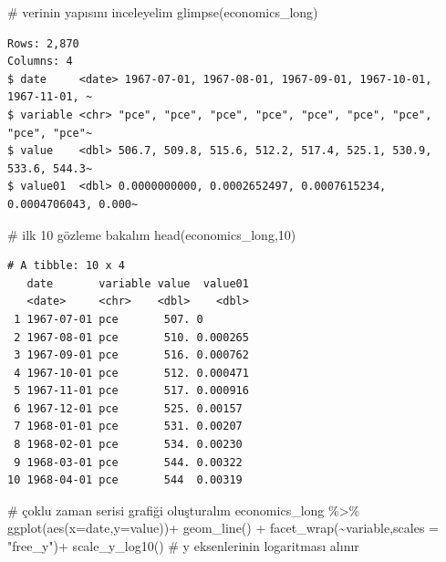 \documentclass[
  letterpaper,
  DIV=11,
  numbers=noendperiod]{scrreprt}
\newenvironment{Shaded}{\begin{snugshade}}{\end{snugshade}}
\newcommand{\AttributeTok}[1]{\textcolor[rgb]{0.40,0.45,0.13}{#1}}
\newcommand{\CommentTok}[1]{\textcolor[rgb]{0.37,0.37,0.37}{#1}}
\newcommand{\DecValTok}[1]{\textcolor[rgb]{0.68,0.00,0.00}{#1}}
\newcommand{\FunctionTok}[1]{\textcolor[rgb]{0.28,0.35,0.67}{#1}}
\newcommand{\NormalTok}[1]{\textcolor[rgb]{0.00,0.23,0.31}{#1}}
\newcommand{\SpecialCharTok}[1]{\textcolor[rgb]{0.37,0.37,0.37}{#1}}
\newcommand{\StringTok}[1]{\textcolor[rgb]{0.13,0.47,0.30}{#1}}
\begin{document}
\begin{Shaded}
\begin{Highlighting}[]
\CommentTok{\# verinin yapısını inceleyelim}
\FunctionTok{glimpse}\NormalTok{(economics\_long)}
\end{Highlighting}
\end{Shaded}

\begin{verbatim}
Rows: 2,870
Columns: 4
$ date     <date> 1967-07-01, 1967-08-01, 1967-09-01, 1967-10-01, 1967-11-01, ~
$ variable <chr> "pce", "pce", "pce", "pce", "pce", "pce", "pce", "pce", "pce"~
$ value    <dbl> 506.7, 509.8, 515.6, 512.2, 517.4, 525.1, 530.9, 533.6, 544.3~
$ value01  <dbl> 0.0000000000, 0.0002652497, 0.0007615234, 0.0004706043, 0.000~
\end{verbatim}

\begin{Shaded}
\begin{Highlighting}[]
\CommentTok{\# ilk 10 gözleme bakalım}
\FunctionTok{head}\NormalTok{(economics\_long,}\DecValTok{10}\NormalTok{)}
\end{Highlighting}
\end{Shaded}

\begin{verbatim}
# A tibble: 10 x 4
   date       variable value  value01
   <date>     <chr>    <dbl>    <dbl>
 1 1967-07-01 pce       507. 0       
 2 1967-08-01 pce       510. 0.000265
 3 1967-09-01 pce       516. 0.000762
 4 1967-10-01 pce       512. 0.000471
 5 1967-11-01 pce       517. 0.000916
 6 1967-12-01 pce       525. 0.00157 
 7 1968-01-01 pce       531. 0.00207 
 8 1968-02-01 pce       534. 0.00230 
 9 1968-03-01 pce       544. 0.00322 
10 1968-04-01 pce       544  0.00319 
\end{verbatim}

\begin{Shaded}
\begin{Highlighting}[]
\CommentTok{\# çoklu zaman serisi grafiği oluşturalım}
\NormalTok{economics\_long }\SpecialCharTok{\%\textgreater{}\%} 
  \FunctionTok{ggplot}\NormalTok{(}\FunctionTok{aes}\NormalTok{(}\AttributeTok{x=}\NormalTok{date,}\AttributeTok{y=}\NormalTok{value))}\SpecialCharTok{+}
  \FunctionTok{geom\_line}\NormalTok{() }\SpecialCharTok{+}
  \FunctionTok{facet\_wrap}\NormalTok{(}\SpecialCharTok{\textasciitilde{}}\NormalTok{variable,}\AttributeTok{scales =} \StringTok{"free\_y"}\NormalTok{)}\SpecialCharTok{+}
  \FunctionTok{scale\_y\_log10}\NormalTok{() }\CommentTok{\# y eksenlerinin logaritması alınır}
\end{Highlighting}
\end{Shaded}
\end{document}
